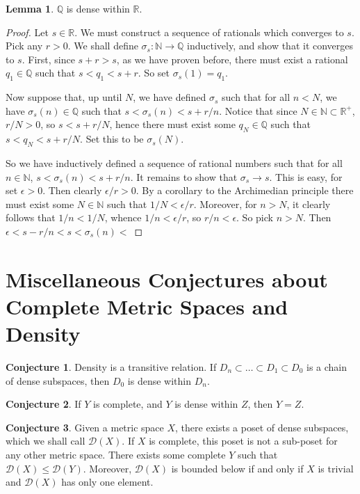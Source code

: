 \documentclass[11pt]{article}
\newcommand{\R}{\mathbb{R}}
\newcommand{\N}{\mathbb{N}}
\newcommand{\Q}{\mathbb{Q}}
\theoremstyle{definition}
\newtheorem{conjecture}{Conjecture}
\newtheorem{lemma}{Lemma}
\begin{document}
\begin{lemma}
$\Q$ is dense within $\R$.
\end{lemma}

\begin{proof}
Let $s\in \R$. We must construct a sequence of rationals which converges to $s$. Pick any $r> 0$. We shall define $\sigma_s: \N\to \Q$ inductively, and show that it converges to $s$. First, since $s+ r > s$, as we have proven before, there must exist a rational $q_1\in \Q$ such that $s < q_1< s+r$. So set $\sigma_s(1) = q_1$. 

Now suppose that, up until $N$, we have defined $\sigma_s$ such that for all $n < N$, we have $\sigma_s(n)\in \Q$ such that $ s < \sigma_s(n) < s + r/n $. Notice that since $N\in \N\subset \R^+$, $r/N > 0$, so $ s < s+ r/N $, hence there must exist some $q_N\in \Q$ such that $ s < q_N < s+ r/N $. Set this to be $\sigma_s(N)$.

So we have inductively defined a sequence of rational numbers such that for all $n\in \N$, $s< \sigma_s(n) < s + r/n $. It remains to show that $ \sigma_s \to s$. This is easy, for set $\epsilon > 0$. Then clearly $\epsilon / r > 0$. By a corollary to the Archimedian principle there must exist some $N\in \N$ such that $1/N < \epsilon /r$. Moreover, for $n> N$, it clearly follows that $1/n  < 1/N$, whence $1/n < \epsilon /r$, so $r/n < \epsilon$. So pick $n> N$. Then $\epsilon < s - r/n < s < \sigma_s(n)< $


\end{proof}

\section{Miscellaneous Conjectures about Complete Metric Spaces and Density}

\begin{conjecture}
Density is a transitive relation. If $D_n \subset \dots \subset D_1\subset D_0$ is a chain of dense subspaces, then $D_0$ is dense within $D_n$.
\end{conjecture}

\begin{conjecture}
If $Y$ is complete, and $Y$ is dense within $Z$, then $Y = Z$. 
\end{conjecture}

\begin{conjecture}
Given a metric space $X$, there exists a poset of dense subspaces, which we shall call $\mathcal{D}(X)$. If $X$ is complete, this poset is not a sub-poset for any other metric space. There exists some complete $Y$ such that $\mathcal{D}(X)\le \mathcal{D}(Y) $. Moreover, $\mathcal{D}(X)$ is bounded below if and only if $X$ is trivial and $\mathcal{D}(X)$ has only one element.
\end{conjecture}
\end{document}
